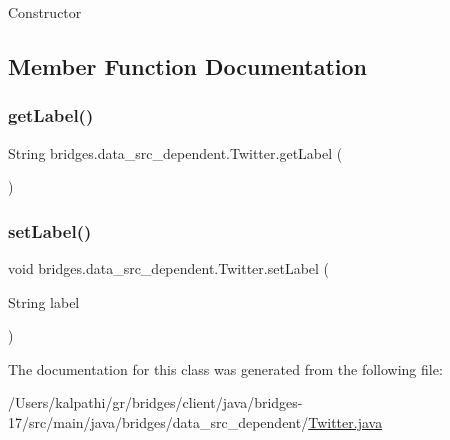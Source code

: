 Constructor 

\subsection{Member Function Documentation}
\mbox{\label{classbridges_1_1data__src__dependent_1_1_twitter_ac7d7ac0808192702bc4a1a790237da8b}} 
\subsubsection{\texorpdfstring{get\+Label()}{getLabel()}}
{\footnotesize\ttfamily String bridges.\+data\+\_\+src\+\_\+dependent.\+Twitter.\+get\+Label (\begin{DoxyParamCaption}{ }\end{DoxyParamCaption})}

\mbox{\label{classbridges_1_1data__src__dependent_1_1_twitter_a4d7d3a015d66029f373d5c8e41659242}} 
\subsubsection{\texorpdfstring{set\+Label()}{setLabel()}}
{\footnotesize\ttfamily void bridges.\+data\+\_\+src\+\_\+dependent.\+Twitter.\+set\+Label (\begin{DoxyParamCaption}\item[{String}]{label }\end{DoxyParamCaption})}



The documentation for this class was generated from the following file\+:\begin{DoxyCompactItemize}
\item 
/\+Users/kalpathi/gr/bridges/client/java/bridges-\/17/src/main/java/bridges/data\+\_\+src\+\_\+dependent/\mbox{\hyperlink{_twitter_8java}{Twitter.\+java}}\end{DoxyCompactItemize}
